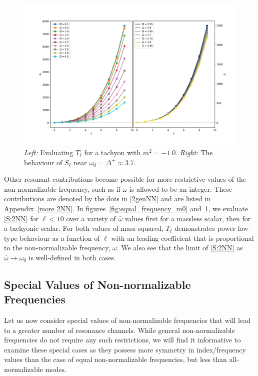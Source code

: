 \documentclass[letterpaper,11pt]{article}
\newcommand{\ob}{\overline{\omega}}
\begin{document}
\begin{figure}[h]
\centering
\includegraphics[width=\textwidth]{./figures/NN_equalfreq_sourceterms_m-1_0+zoom}
\caption{{\it Left:} Evaluating $\overline{T}_{\ell}$ for a tachyon with $m^2 = -1.0$. {\it Right:} The behaviour of $S_\ell$ near $\omega_0 = \Delta^+ \approx  3.7$.}
\label{fig:equal_frequency_m-1_0}
\end{figure}

Other resonant contributions become possible for more restrictive values of the non-normalizable frequency, such as if $\ob$ is allowed to be an integer. These contributions are denoted by the dots in \eqref{2genNN} and are listed in Appendix~\ref{more 2NN}. In figures~\ref{fig:equal_frequency_m0} and~\ref{fig:equal_frequency_m-1_0}, we evaluate \eqref{S:2NN} for $\ell < 10$ over a variety of $\ob$ values first for a massless scalar, then for a tachyonic scalar. For both values of mass-squared, $T_\ell$ demonstrates power law-type behaviour as a function of $\ell$ with an leading coefficient that is proportional to the non-normalizable frequency, $\ob$. We also see that the limit of \eqref{S:2NN} as $\ob \to \omega_0$ is well-defined in both cases.

\subsection{Special Values of Non-normalizable Frequencies}

Let us now consider special values of non-normalizable frequencies that will lead to a greater number of resonance channels. While general non-normalizable frequencies do not require any such restrictions, we will find it informative to examine these special cases as they possess more symmetry in index/frequency values than the case of equal non-normalizable frequencies, but less than all-normalizable modes. 
\end{document}
